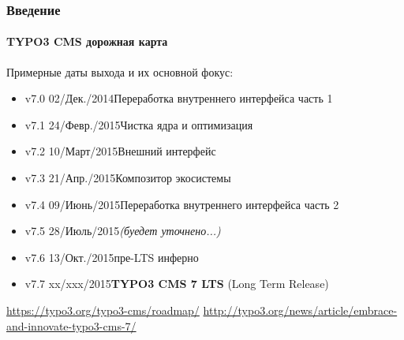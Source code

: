 
\begin{frame}[fragile]
	\frametitle{Введение}
	\framesubtitle{TYPO3 CMS дорожная карта}

	Примерные даты выхода и их основной фокус:

	\begin{itemize}
		\item v7.0 \textrightarrow\tabto{1.3cm}02/Дек./2014\tabto{4cm}Переработка внутреннего интерфейса часть 1

		\item
			\begingroup
				\color{typo3orange}
					v7.1 \textrightarrow\tabto{1.3cm}24/Февр./2015\tabto{4cm}Чистка ядра и оптимизация
			\endgroup

		\item\smaller v7.2 \textrightarrow\tabto{1.2cm}10/Март/2015\tabto{4cm}Внешний интерфейс\normalsize
		\item\smaller v7.3 \textrightarrow\tabto{1.2cm}21/Апр./2015\tabto{4cm}Композитор экосистемы\normalsize
		\item\smaller v7.4 \textrightarrow\tabto{1.2cm}09/Июнь/2015\tabto{4cm}Переработка внутреннего интерфейса часть 2\normalsize
		\item\smaller v7.5 \textrightarrow\tabto{1.2cm}28/Июль/2015\tabto{4cm}\textit{(буедет уточнено...)}\normalsize
		\item\smaller v7.6 \textrightarrow\tabto{1.2cm}13/Окт./2015\tabto{4cm}пре-LTS инферно\normalsize
		\item\smaller v7.7 \textrightarrow\tabto{1.2cm}xx/xxx/2015\tabto{4cm}\textbf{TYPO3 CMS 7 LTS} (Long Term Release)\normalsize
	\end{itemize}

	\smaller
		\url{https://typo3.org/typo3-cms/roadmap/}\newline
		\url{http://typo3.org/news/article/embrace-and-innovate-typo3-cms-7/}
	\normalsize

\end{frame}



